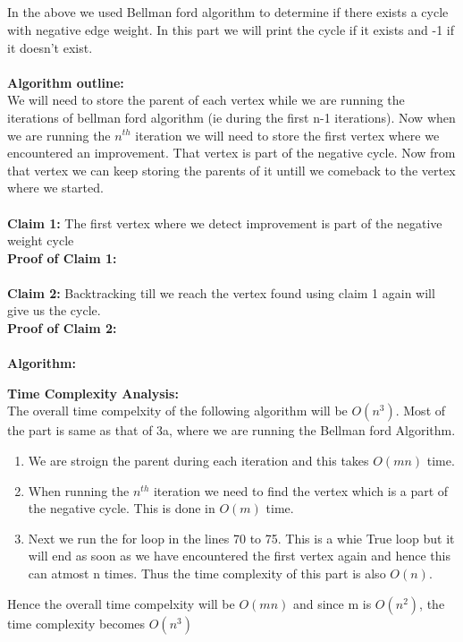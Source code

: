 \documentclass{article}
\begin{document}
\subsection{}
In the above we used Bellman ford algorithm to determine if there exists a cycle with negative edge weight. In this part we will print the cycle if it exists and -1 if it doesn't exist.
\\\\
\textbf{Algorithm outline:}\\
We will need to store the parent of each vertex while we are running the iterations of bellman ford algorithm (ie during the first n-1 iterations). Now when we are running the $n^{th}$ iteration we will need to store the first vertex where we encountered an improvement. That vertex is part of the negative cycle. Now from that vertex we can keep storing the parents of it untill we comeback to the vertex where we started.
\\\\
\textbf{Claim 1:} The first vertex where we detect improvement is part of the negative weight cycle\\
\textbf{Proof of Claim 1:}
\\\\
\textbf{Claim 2:} Backtracking till we reach the vertex found using claim 1 again will give us the cycle.\\
\textbf{Proof of Claim 2:}
\\\\
\textbf{Algorithm:}

\textbf{Time Complexity Analysis:}\\
The overall time compelxity of the following algorithm will be $O(n^3)$. Most of the part is same as that of 3a, where we are running the Bellman ford Algorithm.
\begin{enumerate}
    \item We are stroign the parent during each iteration and this takes $O(mn)$ time. 
    \item When running the $n^{th}$ iteration we need to find the vertex which is a part of the negative cycle. This is done in $O(m)$ time.
    \item Next we run the for loop in the lines 70 to 75. This is a whie True loop but it will end as soon as we have encountered the first vertex again and hence this can atmost n times. Thus the time complexity of this part is also $O(n)$.
\end{enumerate}
Hence the overall time compelxity will be $O(mn)$ and since m is $O(n^2)$, the time complexity becomes $O(n^3)$
\end{document}
